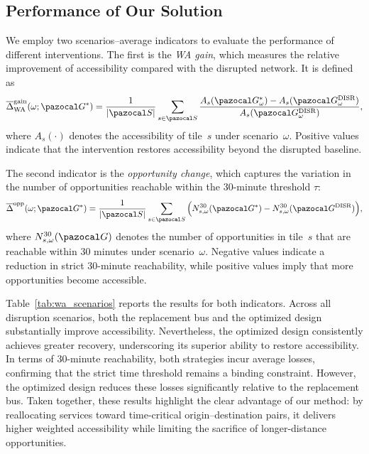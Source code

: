 \documentclass[3p,times,procedia]{elsarticle}
\begin{document}
\subsection{Performance of Our Solution}

We employ two scenarios--average indicators to evaluate the performance of different interventions. The first is the \emph{WA gain}, which measures the relative improvement of accessibility
compared with the disrupted network. It is defined as
\begin{equation}
\overline{\Delta}^\text{gain}_{\text{WA}}(\omega;\pazocal G^\ast)
= \frac{1}{|\pazocal S|}\sum_{s\in\pazocal S}
  \frac{A_{s}(\pazocal G^\ast_\omega) -
        A_{s}(\pazocal G^\text{DISR}_\omega)}
       {A_{s}(\pazocal G^\text{DISR}_\omega)},
\end{equation}
where $A_{s}(\cdot)$ denotes the accessibility of tile~$s$ under scenario~$\omega$. Positive values indicate that the intervention restores accessibility beyond the disrupted baseline.

The second indicator is the \emph{opportunity change}, which captures the variation in the number of opportunities reachable within the 30-minute threshold $\tau$:
\begin{equation}
\overline{\Delta}^{\text{opp}}(\omega;\pazocal G^\ast)
= \frac{1}{|\pazocal S|}\sum_{s\in\pazocal S}
  \Big(N^{30}_{s,\omega}(\pazocal G^\ast) -
       N^{30}_{s,\omega}(\pazocal G^\text{DISR})\Big),
\end{equation}
where $N^{30}_{s,\omega}(\pazocal G)$ denotes the number of opportunities in tile~$s$ that are reachable within 30 minutes under scenario~$\omega$. Negative values indicate a reduction in strict 30-minute reachability, while positive values imply that more opportunities become accessible.

Table~\ref{tab:wa_scenarios} reports the results for both indicators. Across all disruption scenarios, both the replacement bus and the optimized design substantially improve accessibility.
Nevertheless, the optimized design consistently achieves greater recovery, underscoring its superior ability to restore accessibility. In terms of 30-minute reachability, both strategies incur average
losses, confirming that the strict time threshold remains a binding constraint. 
%
However, the optimized design reduces these losses significantly relative to the replacement bus. 
%
Taken together, these results highlight the clear advantage of our method: by reallocating services toward time-critical origin--destination pairs, it delivers higher weighted accessibility while limiting the sacrifice of longer-distance opportunities.
\end{document}
